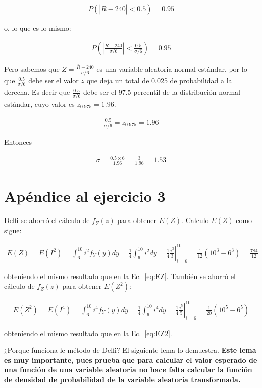 \documentclass[10pt]{article}
\begin{document}
\begin{align*}
    P(|\bar{R}-240|<0.5)=0.95
\end{align*}

o, lo que es lo mismo:

\begin{align*}
    P\left(\left|\frac{\bar{R}-240}{\sigma/6}\right|<\frac{0.5}{\sigma/6}\right)=0.95
\end{align*}

Pero sabemos que $Z=\frac{\bar{R}-240}{\sigma/6}$ es una variable aleatoria normal
estándar, por lo que $\frac{0.5}{\sigma/6}$ debe ser el valor $z$ que deja
un total de 0.025 de probabilidad a la derecha. Es decir que
$\frac{0.5}{\sigma/6}$ debe ser el 97.5 percentil de la distribución normal
estándar, cuyo valor es $z_{0.975}=1.96$.

\begin{align*}
    \frac{0.5}{\sigma/6}=z_{0.975}=1.96
\end{align*}

Entonces

\begin{align*}
    \sigma=\frac{0.5\times 6}{1.96}=\frac{3}{1.96}=1.53
\end{align*}

\pagebreak
\section*{Apéndice al ejercicio 3}

Delfi se ahorró el cálculo de $f_Z(z)$ para obtener $E(Z)$. Calculo $E(Z)$
como sigue:

\begin{align*}
    E(Z)=E(I^2)=\int_6^{10}i^2f_Y(y)dy=\frac{1}{4}\int_6^{10}i^2dy=\frac{1}{4}\left.\frac{i^3}{3}\right|_{i=6}^{10}=\frac{1}{12}\left(10^3-6^3\right)=\frac{784}{12}
\end{align*}

obteniendo el mismo resultado que en la Ec.~\ref{eq:EZ}.
%
También se ahorró el cálculo de $f_Z(z)$ para obtener $E(Z^2)$:

\begin{align*}
    E(Z^2)=E(I^4)=\int_6^{10}i^4f_Y(y)dy=\frac{1}{4}\int_6^{10}i^4dy=\frac{1}{4}\left.\frac{i^5}{5}\right|_{i=6}^{10}=\frac{1}{20}\left(10^5-6^5\right)
\end{align*}

obteniendo el mismo resultado que en la Ec.~\ref{eq:EZ2}.

¿Porque funciona le método de Delfi? El siguiente lema lo demuestra.
\textbf{Este lema es muy importante, pues prueba que para calcular el valor
esperado de una función de una variable aleatoria no hace falta calcular la
función de densidad de probabilidad de la variable aleatoria transformada.}
\end{document}
